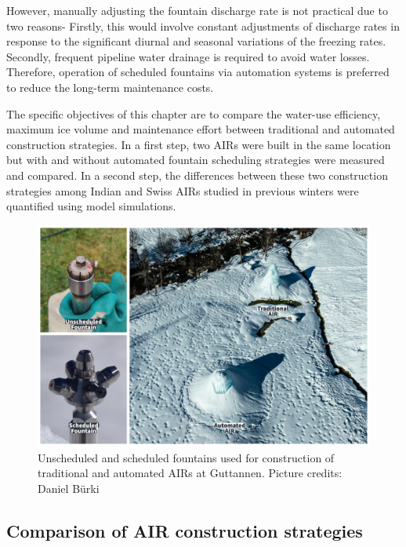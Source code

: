 However, manually adjusting the fountain discharge rate is not practical due to two reasons- Firstly, this would
involve constant adjustments of discharge rates in response to the significant diurnal and seasonal variations
of the freezing rates. Secondly, frequent pipeline water drainage is required to avoid water losses. Therefore,
operation of scheduled fountains via automation systems is preferred to reduce the long-term maintenance costs.

The specific objectives of this chapter are to compare the water-use efficiency, maximum ice volume and
maintenance effort between traditional and automated construction strategies. In a first step, two AIRs were
built in the same location but with and without automated fountain scheduling strategies were measured and
compared. In a second step, the differences between these two construction strategies among Indian and Swiss
AIRs studied in previous winters were quantified using model simulations. 

\begin{figure}[htb]
\includegraphics[width=12cm]{figs/AIR_fountains.jpg}
\caption{Unscheduled and scheduled fountains used for construction of traditional and automated AIRs at Guttannen. Picture credits: Daniel Bürki}
\label{fig:2AIR}
\end{figure}

\subsection{Comparison of AIR construction strategies}

